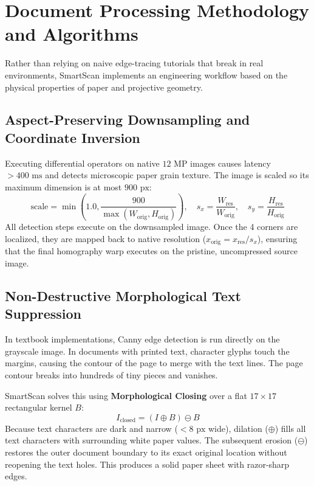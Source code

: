 \documentclass[11pt,a4paper]{article}
\begin{document}
\newpage
\section{Document Processing Methodology and Algorithms}
\label{sec:methodology}

Rather than relying on naive edge-tracing tutorials that break in real environments, SmartScan implements an engineering workflow based on the physical properties of paper and projective geometry.

\subsection{Aspect-Preserving Downsampling and Coordinate Inversion}
Executing differential operators on native $12\text{ MP}$ images causes latency $> 400\text{ ms}$ and detects microscopic paper grain texture. The image is scaled so its maximum dimension is at most $900\text{ px}$:
\begin{equation}
    \text{scale} = \min\left(1.0, \frac{900}{\max(W_{\text{orig}}, H_{\text{orig}})}\right), \quad s_x = \frac{W_{\text{res}}}{W_{\text{orig}}}, \quad s_y = \frac{H_{\text{res}}}{H_{\text{orig}}}
\end{equation}
All detection steps execute on the downsampled image. Once the 4 corners are localized, they are mapped back to native resolution ($x_{\text{orig}} = x_{\text{res}} / s_x$), ensuring that the final homography warp executes on the pristine, uncompressed source image.

\subsection{Non-Destructive Morphological Text Suppression}
In textbook implementations, Canny edge detection is run directly on the grayscale image. In documents with printed text, character glyphs touch the margins, causing the contour of the page to merge with the text lines. The page contour breaks into hundreds of tiny pieces and vanishes.

SmartScan solves this using \textbf{Morphological Closing} over a flat $17 \times 17$ rectangular kernel $B$:
\begin{equation}
    I_{\text{closed}} = (I \oplus B) \ominus B
\end{equation}
Because text characters are dark and narrow ($< 8\text{ px}$ wide), dilation ($\oplus$) fills all text characters with surrounding white paper values. The subsequent erosion ($\ominus$) restores the outer document boundary to its exact original location without reopening the text holes. This produces a solid paper sheet with razor-sharp edges.
\end{document}
